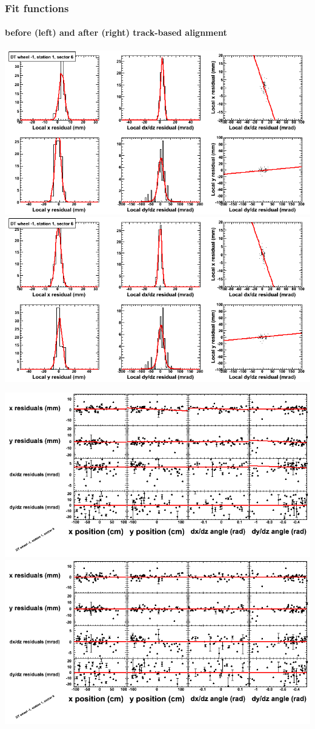 \documentclass[compress]{beamer}
\begin{document}
\begin{frame}
\frametitle{Fit functions}
\framesubtitle{before (left) and after (right) track-based alignment}
\includegraphics[width=0.5\linewidth]{fitfunctions_re01/MBwhBst1sec06_bellcurves.png} \includegraphics[width=0.5\linewidth]{fitfunctions_re05/MBwhBst1sec06_bellcurves.png}

\includegraphics[width=0.5\linewidth]{fitfunctions_re01/MBwhBst1sec06_polynomials.png} \includegraphics[width=0.5\linewidth]{fitfunctions_re05/MBwhBst1sec06_polynomials.png}
\end{frame}
\end{document}
